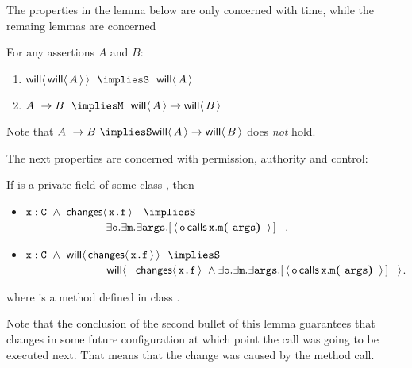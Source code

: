 \documentclass[acmsmall,screen,anonymous,review]{acmart}
\begin{document}
The properties in the lemma below are only concerned with time, while the remaing lemmas are concerned 

\begin{lemma}[Time]
\label{lemma:time}
For any assertions $A$ and $B$:

\begin{enumerate}
\item
$\Future {\Future A}  \ \  \impliesS  \ \  \Future A$
\item 
$A \ \rightarrow B \  \    \impliesM  \ \    \Future A \rightarrow \Future B$
\end{enumerate}

\end{lemma}
Note that $A \ \rightarrow B \ \impliesS   \Future A \rightarrow \Future B$ does \emph{not} hold.


The next properties are concerned with permission, authority and control:

\begin{lemma}
\label{lemma:change}
If  is a private field of some class , then

\begin{itemize}
\item
$\prg{x}:\prg{C}\ \wedge \   {\Changes{\prg{x.f}}} \ \ \ \impliesS $\\
$\strut\hspace{1in} 
     \exists \prg{o}.\exists \prg{m} .\exists \prg{args}.
[\, {\Calls {\prg{o}}   {\prg{m}} {\prg{x}}  {\prg{args}} }\, ]\ \ $. 

\item
$\prg{x}:\prg{C}\ \wedge \ \Future  {\Changes{\prg{x.f}}} \ \ \impliesS $\\
$\strut\hspace{1in} 
\Future {\ \  \Changes{\prg{x.f}} \ \wedge \exists \prg{o}.\exists \prg{m} .\exists \prg{args}.
[\, {\Calls {\prg{o}}   {\prg{m}} {\prg{x}}  {\prg{args}} }\, ]\ \ }$. 
\end{itemize}
where  is a method defined in class .

\end{lemma}

Note that the conclusion of the second bullet of this lemma guarantees that  changes in some future configuration at which point 
the call  was going to be executed next.  That means that the change was caused by the method call.
\end{document}
